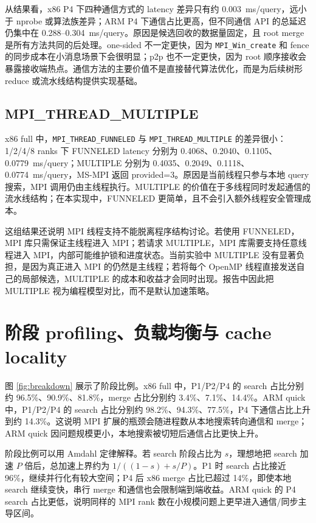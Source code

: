 \documentclass[11pt,a4paper]{article}
\newcommand{\msq}{ms/query}
\begin{document}
从结果看，x86 P4 下四种通信方式的 latency 差异只有约 0.003~\msq，远小于 nprobe 或算法族差异；ARM P4 下通信占比更高，但不同通信 API 的总延迟仍集中在 0.288--0.304~\msq。原因是候选回收的数据量固定，且 root merge 是所有方法共同的后处理。one-sided 不一定更快，因为 \texttt{MPI\_Win\_create} 和 fence 的同步成本在小消息场景下会很明显；p2p 也不一定更快，因为 root 顺序接收会暴露接收端热点。通信方法的主要价值不是直接替代算法优化，而是为后续树形 reduce 或流水线结构提供实现基础。

\subsection{MPI\_THREAD\_MULTIPLE}

x86 full 中，\texttt{MPI\_THREAD\_FUNNELED} 与 \texttt{MPI\_THREAD\_MULTIPLE} 的差异很小：1/2/4/8 ranks 下 FUNNELED latency 分别为 0.4068、0.2040、0.1105、0.0779~\msq；MULTIPLE 分别为 0.4035、0.2049、0.1118、0.0774~\msq，MS-MPI 返回 provided=3。原因是当前线程只参与本地 query 搜索，MPI 调用仍由主线程执行。MULTIPLE 的价值在于多线程同时发起通信的流水线结构；在本实现中，FUNNELED 更简单，且不会引入额外线程安全管理成本。

这组结果还说明 MPI 线程支持不能脱离程序结构讨论。若使用 FUNNELED，MPI 库只需保证主线程进入 MPI；若请求 MULTIPLE，MPI 库需要支持任意线程进入 MPI，内部可能维护锁和进度状态。当前实验中 MULTIPLE 没有显著负担，是因为真正进入 MPI 的仍然是主线程；若将每个 OpenMP 线程直接发送自己的局部候选，MULTIPLE 的成本和收益才会同时出现。报告中因此把 MULTIPLE 视为编程模型对比，而不是默认加速策略。

\section{阶段 profiling、负载均衡与 cache locality}

图 \ref{fig:breakdown} 展示了阶段比例。x86 full 中，P1/P2/P4 的 search 占比分别约 96.5\%、90.9\%、81.8\%，merge 占比分别约 3.4\%、7.1\%、14.4\%。ARM quick 中，P1/P2/P4 的 search 占比分别约 98.2\%、94.3\%、77.5\%，P4 下通信占比上升到约 14.3\%。这说明 MPI 扩展的瓶颈会随进程数从本地搜索转向通信和 merge；ARM quick 因问题规模更小，本地搜索被切短后通信占比更快上升。

阶段比例可以用 Amdahl 定律解释。若 search 阶段占比为 $s$，理想地把 search 加速 $P$ 倍后，总加速上界约为 $1/((1-s)+s/P)$。P1 时 search 占比接近 96\%，继续并行化有较大空间；P4 后 x86 merge 占比已超过 14\%，即使本地 search 继续变快，串行 merge 和通信也会限制端到端收益。ARM quick 的 P4 search 占比更低，说明同样的 MPI rank 数在小规模问题上更早进入通信/同步主导区间。
\end{document}
